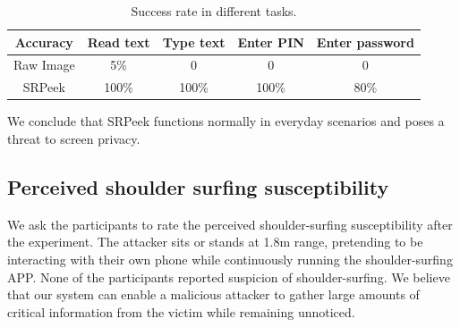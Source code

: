 \begin{table}[!t]
\centering
\caption{Success rate in different tasks.}
\label{table-task}
\begin{tabular}{@{}ccccc@{}}
	\toprule
Accuracy & Read text & Type text & Enter PIN & Enter password\\ \midrule
Raw Image & 5\% & 0 & 0 & 0\\
SRPeek & 100\% & 100\% & 100\% & 80\%\\ \bottomrule
\end{tabular}

\end{table}

We conclude that \textsf{SRPeek} functions normally in everyday scenarios and poses a threat to screen privacy.

\subsection{Perceived shoulder surfing susceptibility}
We ask the participants to rate the perceived shoulder-surfing susceptibility after the experiment. The attacker sits or stands at 1.8m range, pretending to be interacting with their own phone while continuously running the shoulder-surfing APP. None of the participants reported suspicion of shoulder-surfing. We believe that our system can enable a malicious attacker to gather large amounts of critical information from the victim while remaining unnoticed.




